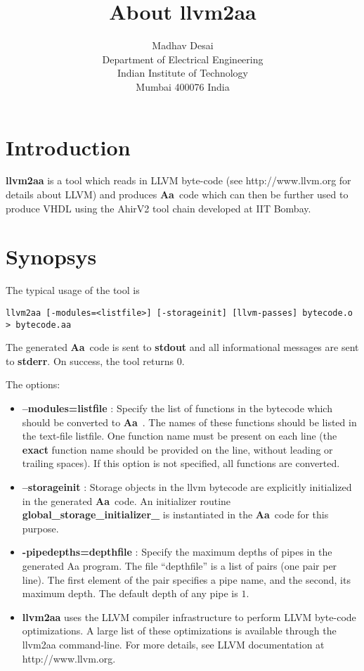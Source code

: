 \documentclass{article}
\title{About {\bf llvm2aa}}
\author{Madhav Desai \\ Department of Electrical Engineering \\ Indian Institute of Technology \\
	Mumbai 400076 India}
\newcommand{\Aa}{{\bf Aa}~}
\begin{document}
\maketitle

\section{Introduction}

{\bf llvm2aa}  is a tool which reads in LLVM byte-code (see http://www.llvm.org for
details about LLVM) and produces \Aa code which can then be further used
to produce VHDL using the AhirV2 tool chain developed at IIT Bombay.

\section{Synopsys}

The typical usage of the tool is 
\begin{verbatim}
llvm2aa [-modules=<listfile>] [-storageinit] [llvm-passes] bytecode.o > bytecode.aa
\end{verbatim}
The generated \Aa code is sent to {\bf stdout} and all informational
messages are sent to {\bf stderr}.  On success, the tool returns 0.

The options:
\begin{itemize}
\item {\bf --modules=listfile} : Specify the list of functions in the bytecode
which should be converted to \Aa.   The names of these functions should be
listed in the text-file listfile.  One function name must be present
on each line (the {\bf exact} function name should be provided on the line, without leading
or trailing spaces).  If this option is not specified, all functions
are converted.
\item {\bf --storageinit} :  Storage objects in the llvm bytecode
are explicitly initialized in the generated \Aa code.   An initializer
routine {\bf global\_storage\_initializer\_} is instantiated in
the \Aa code for this purpose.
\item {\bf -pipedepths=depthfile} : Specify the maximum depths of
pipes in the generated Aa program. The file ``depthfile'' is a list
of pairs (one pair per line).  The first element of the pair specifies
a pipe name, and the second, its maximum depth.   The default depth
of any pipe is $1$.
\item {\bf llvm2aa} uses the LLVM compiler
infrastructure to perform LLVM byte-code optimizations.  A large list
of these optimizations is available through the llvm2aa command-line.
For more details, see LLVM documentation at http://www.llvm.org.
\end{itemize}
\end{document}
